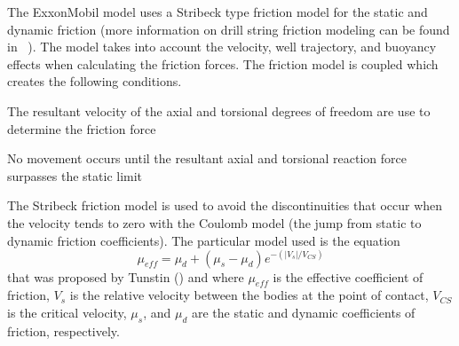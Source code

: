 The ExxonMobil model uses a Stribeck type friction model for the static and dynamic friction (more information on drill string friction modeling can be found in ~\cite{ref:cayeux2020a}).  The model takes into account the velocity, well trajectory, and buoyancy effects when calculating the friction forces. The friction model is coupled which creates the following conditions.
\begin{bulletedlist}
    \item The resultant velocity of the axial and torsional degrees of freedom are use to determine the friction force
    \item No movement occurs until the resultant axial and torsional reaction force surpasses the static limit
\end{bulletedlist}

The Stribeck friction model is used to avoid the discontinuities that occur when the velocity tends to zero with the Coulomb model (the jump from static to dynamic friction coefficients). The particular model used is the equation
\begin{equation}
	\label{Fig:tunstinfrictionmodel}
	\mu_{eff} = \mu_{d} + (\mu_{s} - \mu_{d}) e^{-(|V_s|/V_{CS})}
\end{equation}
that was proposed by Tunstin (\cite{ref:tustin1947a}) and where $\mu_{eff}$ is the effective coefficient of friction, $V_s$ is the relative velocity between the bodies at the point of contact, $V_{CS}$ is the critical velocity, $\mu_{s}$, and $\mu_{d}$ are the static and dynamic coefficients of friction, respectively.

